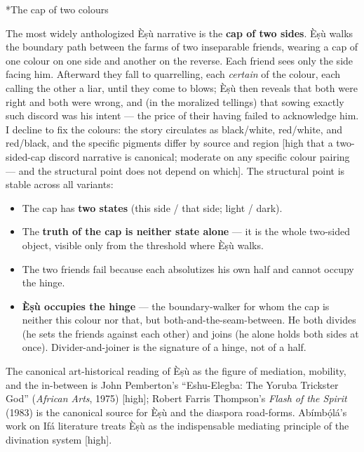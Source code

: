 \documentclass[11pt]{article}
\makeatletter
\renewcommand\paragraph{\@startsection{paragraph}{4}{\z@}{2ex plus 1ex}{0.4ex}{\normalfont\normalsize\bfseries}}
\makeatother
\begin{document}
\paragraph*{The cap of two colours}

The most widely anthologized Èṣù narrative is the \textbf{cap of two sides}. Èṣù walks the boundary path between the farms of two inseparable friends, wearing a cap of one colour on one side and another on the reverse. Each friend sees only the side facing him. Afterward they fall to quarrelling, each \emph{certain} of the colour, each calling the other a liar, until they come to blows; Èṣù then reveals that both were right and both were wrong, and (in the moralized tellings) that sowing exactly such discord was his intent — the price of their having failed to acknowledge him. I decline to fix the colours: the story circulates as black/\allowbreak{}white, red/\allowbreak{}white, and red/\allowbreak{}black, and the specific pigments differ by source and region [high that a two-sided-cap discord narrative is canonical; moderate on any specific colour pairing — and the structural point does not depend on which]. The structural point is stable across all variants:

\begin{itemize}
\item The cap has \textbf{two states} (this side /\allowbreak{} that side; light /\allowbreak{} dark).
\item The \textbf{truth of the cap is neither state alone} — it is the whole two-sided object, visible only from the threshold where Èṣù walks.
\item The two friends fail because each absolutizes his own half and cannot occupy the hinge.
\item \textbf{Èṣù occupies the hinge} — the boundary-walker for whom the cap is neither this colour nor that, but both-and-the-seam-between. He both divides (he sets the friends against each other) and joins (he alone holds both sides at once). Divider-and-joiner is the signature of a hinge, not of a half.
\end{itemize}

The canonical art-historical reading of Èṣù as the figure of mediation, mobility, and the in-between is John Pemberton's ``Eshu-Elegba: The Yoruba Trickster God'' (\emph{African Arts}, 1975) [high]; Robert Farris Thompson's \emph{Flash of the Spirit} (1983) is the canonical source for Èṣù and the diaspora road-forms. Abímbọ́lá's work on Ifá literature treats Èṣù as the indispensable mediating principle of the divination system [high]. 
\end{document}
